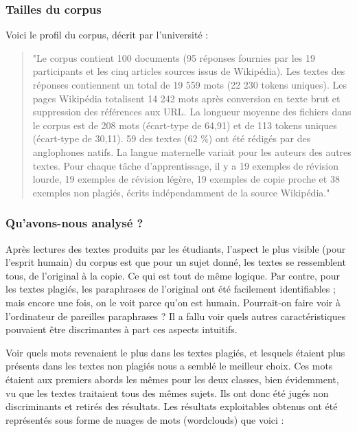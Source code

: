 \subsubsection{Tailles du corpus}

Voici le profil du corpus, décrit par l'université : 
\begin{quote}
    "Le corpus contient 100 documents (95 réponses fournies par les 19 participants et les cinq articles sources issus de Wikipédia). Les textes des réponses contiennent un total de 19 559 mots (22 230 tokens uniques). Les pages Wikipédia totalisent 14 242 mots après conversion en texte brut et suppression des références aux URL. La longueur moyenne des fichiers dans le corpus est de 208 mots (écart-type de 64,91) et de 113 tokens uniques (écart-type de 30,11). 59 des textes (62 \%) ont été rédigés par des anglophones natifs. La langue maternelle variait pour les auteurs des autres textes. Pour chaque tâche d’apprentissage, il y a 19 exemples de révision lourde, 19 exemples de révision légère, 19 exemples de copie proche et 38 exemples non plagiés, écrits indépendamment de la source Wikipédia."
\end{quote}

\subsubsection{Qu'avons-nous analysé ?}

Après lectures des textes produits par les étudiants, l'aspect le plus visible (pour l'esprit humain) du corpus est que pour un sujet donné, les textes se ressemblent tous, de l'original à la copie. Ce qui est tout de même logique. Par contre, pour les textes plagiés, les paraphrases de l'original ont été facilement identifiables ; mais encore une fois, on le voit parce qu'on est humain. Pourrait-on faire voir à l'ordinateur de pareilles paraphrases ? Il a fallu voir quels autres caractéristiques pouvaient être discrimantes à part ces aspects intuitifs. 

Voir quels mots revenaient le plus dans les textes plagiés, et lesquels étaient plus présents dans les textes non plagiés nous a semblé le meilleur choix. Ces mots étaient aux premiers abords les mêmes pour les deux classes, bien évidemment, vu que les textes traitaient tous des mêmes sujets. Ils ont donc été jugés non discriminants et retirés des résultats. Les résultats exploitables obtenus ont été représentés sous forme de nuages de mots (wordclouds) que voici : 

